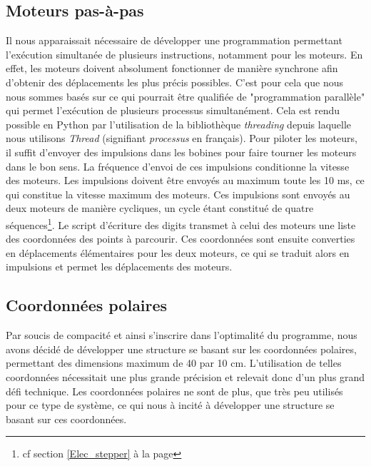 \documentclass[12pt,a4paper]{report}
\begin{document}
\subsection*{Moteurs pas-à-pas}
Il nous apparaissait nécessaire de développer une programmation permettant l'exécution simultanée de plusieurs instructions, notamment pour les moteurs. En effet, les moteurs doivent absolument fonctionner de manière synchrone afin d'obtenir des déplacements les plus précis possibles. C'est pour cela que nous nous sommes basés sur ce qui pourrait être qualifiée de "programmation parallèle" qui permet l'exécution de plusieurs processus simultanément. Cela est rendu possible en Python par l'utilisation de la bibliothèque \emph{threading} depuis laquelle nous utilisons \emph{Thread} (signifiant \emph{processus} en français). 
Pour piloter les moteurs, il suffit d'envoyer des impulsions dans les bobines pour faire tourner les moteurs dans le bon sens. La fréquence d'envoi de ces impulsions conditionne la vitesse des moteurs. Les impulsions doivent être envoyés au maximum toute les 10 ms, ce qui constitue la vitesse maximum des moteurs. Ces impulsions sont envoyés au deux moteurs de manière cycliques, un cycle étant constitué de quatre séquences\footnote{cf section \ref{Elec_stepper} à la page \pageref{Elec_stepper}}. Le script d'écriture des digits transmet à celui des moteurs une liste des coordonnées des points à parcourir. Ces coordonnées sont ensuite converties en déplacements élémentaires pour les deux moteurs, ce qui se traduit alors en impulsions et permet les déplacements des moteurs.

\subsection*{Coordonnées polaires}
Par soucis de compacité et ainsi s'inscrire dans l'optimalité du programme, nous avons décidé de développer une structure se basant sur les coordonnées polaires, permettant des dimensions maximum de 40 par 10 cm. L'utilisation de telles coordonnées nécessitait une plus grande précision et relevait donc d'un plus grand défi technique. Les coordonnées polaires ne sont de plus, que très peu utilisés pour ce type de système, ce qui nous à incité à développer une structure se basant sur ces coordonnées.
\end{document}
